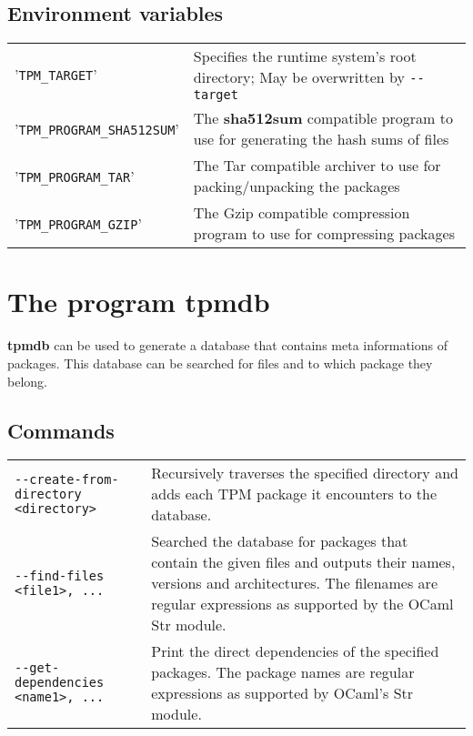 \documentclass[a4paper]{article}
\newcommand{\program}[1]{\textbf{#1}}
\newcommand{\variable}[1]{'\texttt{#1}'}
\begin{document}
	\subsection{Environment variables}
	\label{sec:environment_variables}
	
	\bgroup
	\def\arraystretch{1.5}
	\begin{tabularx}{\textwidth}{lX}
		\variable{TPM\_TARGET} & Specifies the runtime system's root directory; May be overwritten by \texttt{-{}-target} \\
		
		\variable{TPM\_PROGRAM\_SHA512SUM} & The \program{sha512sum} compatible program to use for generating the hash sums of files \\

		\variable{TPM\_PROGRAM\_TAR} & The Tar compatible archiver to use for packing/unpacking the packages \\

		\variable{TPM\_PROGRAM\_GZIP} & The Gzip compatible compression program to use for compressing packages \\
	\end{tabularx}
	\egroup
	
	\section{The program \program{tpmdb}}
	\label{sec:the_program_tpmdb}
	
	\program{tpmdb} can be used to generate a database that contains meta informations of packages. This database can be searched for files and to which package they belong.
	
	\subsection{Commands}
	\bgroup
	\def\arraystretch{1.5}
	\begin{tabularx}{\textwidth}{lX}
		\texttt{-{}-create-from-directory <directory>} & Recursively traverses the specified directory and adds each TPM package it encounters to the database. \\
		
		\texttt{-{}-find-files <file1>, ...} & Searched the database for packages that contain the given files and outputs their names, versions and architectures. The filenames are regular expressions as supported by the OCaml Str module. \\
		
		\texttt{-{}-get-dependencies <name1>, ...} & Print the direct dependencies of the specified packages. The package names are regular expressions as supported by OCaml's Str module. \\
	\end{tabularx}
	\egroup
	
\end{document}
